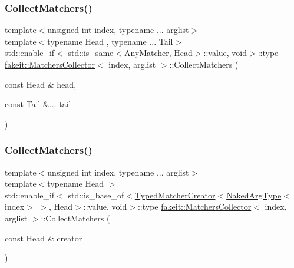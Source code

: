 \mbox{\label{classfakeit_1_1MatchersCollector_a5bc97a3d729b1bb67e372181ad88b77d}} 
\subsubsection{\texorpdfstring{CollectMatchers()}{CollectMatchers()}\hspace{0.1cm}{\footnotesize\ttfamily [59/63]}}
{\footnotesize\ttfamily template$<$unsigned int index, typename ... arglist$>$ \\
template$<$typename Head , typename ... Tail$>$ \\
std\+::enable\+\_\+if$<$ std\+::is\+\_\+same$<$\mbox{\hyperlink{structfakeit_1_1AnyMatcher}{Any\+Matcher}}, Head$>$\+::value, void$>$\+::type \mbox{\hyperlink{classfakeit_1_1MatchersCollector}{fakeit\+::\+Matchers\+Collector}}$<$ index, arglist $>$\+::Collect\+Matchers (\begin{DoxyParamCaption}\item[{const Head \&}]{head,  }\item[{const Tail \&...}]{tail }\end{DoxyParamCaption})\hspace{0.3cm}{\ttfamily [inline]}}

\mbox{\label{classfakeit_1_1MatchersCollector_ae954aa74286bcd096169067f5e897356}} 
\subsubsection{\texorpdfstring{CollectMatchers()}{CollectMatchers()}\hspace{0.1cm}{\footnotesize\ttfamily [60/63]}}
{\footnotesize\ttfamily template$<$unsigned int index, typename ... arglist$>$ \\
template$<$typename Head $>$ \\
std\+::enable\+\_\+if$<$ std\+::is\+\_\+base\+\_\+of$<$\mbox{\hyperlink{structfakeit_1_1TypedMatcherCreator}{Typed\+Matcher\+Creator}}$<$\mbox{\hyperlink{classfakeit_1_1MatchersCollector_aeda8ced6a2f0cb7c6e4f916f18a91730}{Naked\+Arg\+Type}}$<$index$>$ $>$, Head$>$\+::value, void$>$\+::type \mbox{\hyperlink{classfakeit_1_1MatchersCollector}{fakeit\+::\+Matchers\+Collector}}$<$ index, arglist $>$\+::Collect\+Matchers (\begin{DoxyParamCaption}\item[{const Head \&}]{creator }\end{DoxyParamCaption})\hspace{0.3cm}{\ttfamily [inline]}}

